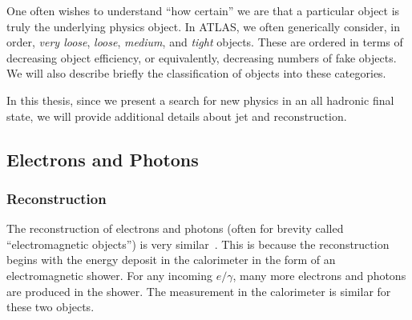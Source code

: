 One often wishes to understand ``how certain'' we are that a particular object is truly the underlying physics object.
In ATLAS, we often generically consider, in order, \textit{very loose}, \textit{loose}, \textit{medium}, and \textit{tight} objects\footnotemark.
These are ordered in terms of decreasing object efficiency, or equivalently, decreasing numbers of fake objects.
We will also describe briefly the classification of objects into these categories.

In this thesis, since we present a search for new physics in an all hadronic final state, we will provide additional details about jet and \met reconstruction.


\subsection{Electrons and Photons}

\subsubsection{Reconstruction}
The reconstruction of electrons and photons (often for brevity called ``electromagnetic objects'') is very similar~\cite{Aaboud:2016yuq,PERF-2013-05,PERF-2013-03}.
This is because the reconstruction begins with the energy deposit in the calorimeter in the form of an electromagnetic shower.
For any incoming $e/\gamma$, many more electrons and photons are produced in the shower.
The measurement in the calorimeter is similar for these two objects.

